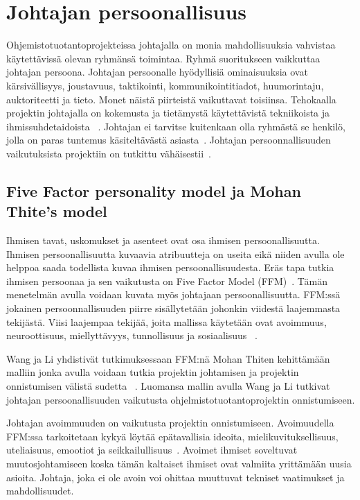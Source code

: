 \documentclass[finnish]{tktltiki2}
\theoremstyle{definition}
\theoremstyle{remark}
\begin{document}
\section{Johtajan persoonallisuus}

Ohjemistotuotantoprojekteissa johtajalla on monia mahdollisuuksia vahvistaa käytettävissä olevan ryhmänsä toimintaa. Ryhmä suoritukseen vaikkuttaa johtajan persoona. Johtajan persoonalle hyödyllisiä ominaisuuksia ovat kärsivällisyys, joustavuus, taktikointi, kommunikointitiadot, huumorintaju, auktoriteetti ja tieto. Monet näistä piirteistä vaikuttavat toisiinsa. Tehokaalla projektin johtajalla on kokemusta ja tietämystä käytettävistä tekniikoista ja ihmissuhdetaidoista ~\cite{McLeod:2011:FAS:1978802.1978803}. Johtajan ei tarvitse kuitenkaan olla ryhmästä se henkilö, jolla on paras tuntemus käsiteltävästä asiasta~\cite{4017705}. Johtajan persoonnallisuuden vaikutuksista projektiin on tutkittu vähäisestii~\cite{Wang:2009:PMP:1639950.1640049}. 


\subsection{Five Factor personality model ja Mohan Thite's model }

Ihmisen tavat, uskomukset ja asenteet ovat osa ihmisen persoonallisuutta. Ihmisen persoonallisuutta kuvaavia atribuutteja on useita eikä niiden avulla ole helppoa saada todellista kuvaa ihmisen persoonallisuudesta. Eräs tapa tutkia ihmisen persoonaa ja sen vaikutusta on Five Factor Model (FFM)~\cite{barrick2006big}. Tämän menetelmän avulla voidaan kuvata myös johtajaan persoonallisuutta. FFM:ssä jokainen persoonnallisuuden piirre sisällytetään johonkin viidestä laajemmasta tekijästä. Viisi laajempaa tekijää, joita mallissa käytetään ovat avoimmuus, neuroottisuus, miellyttävyys, tunnollisuus ja sosiaalisuus ~\cite{barrick2006big}.

Wang ja Li yhdistivät tutkimuksessaan FFM:nä Mohan Thiten kehittämään malliin jonka avulla voidaan tutkia projektin johtamisen ja projektin onnistumisen välistä sudetta ~\cite{Wang:2009:PMP:1639950.1640049}. Luomansa mallin avulla Wang ja Li tutkivat johtajan persoonallisuuden vaikutusta ohjelmistotuotantoprojektin onnistumiseen. 

Johtajan avoimmuuden on vaikutusta projektin onnistumiseen. Avoimuudella FFM:ssa tarkoitetaan kykyä löytää epätavallisia ideoita, mielikuvituksellisuus, uteliaisuus, emootiot ja seikkailullisuus~\cite{Wang:2009:PMP:1639950.1640049}. Avoimet ihmiset soveltuvat muutosjohtamiseen koska tämän kaltaiset ihmiset ovat valmiita yrittämään uusia asioita. Johtaja, joka ei ole avoin voi ohittaa muuttuvat tekniset vaatimukset ja mahdollisuudet. 
\end{document}
